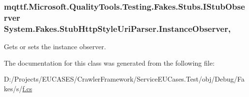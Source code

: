 \hypertarget{class_system_1_1_fakes_1_1_stub_http_style_uri_parser_a93f4e2ca504266b466f8a6fe78fed0f6}{
\subsubsection[{Instance\-Observer}]{\setlength{\rightskip}{0pt plus 5cm}mqttf.\-Microsoft.\-Quality\-Tools.\-Testing.\-Fakes.\-Stubs.\-I\-Stub\-Observer System.\-Fakes.\-Stub\-Http\-Style\-Uri\-Parser.\-Instance\-Observer\hspace{0.3cm}{\ttfamily [get]}, {\ttfamily [set]}}}\label{class_system_1_1_fakes_1_1_stub_http_style_uri_parser_a93f4e2ca504266b466f8a6fe78fed0f6}


Gets or sets the instance observer.



The documentation for this class was generated from the following file\-:\begin{DoxyCompactItemize}
\item 
D\-:/\-Projects/\-E\-U\-C\-A\-S\-E\-S/\-Crawler\-Framework/\-Service\-E\-U\-Cases.\-Test/obj/\-Debug/\-Fakes/s/\hyperlink{s_2f_8cs}{f.\-cs}\end{DoxyCompactItemize}
